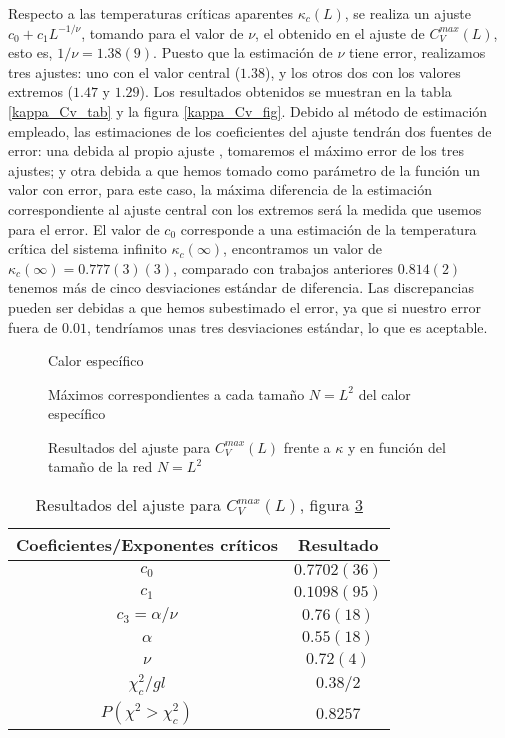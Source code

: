 Respecto a las temperaturas críticas aparentes $\kappa_c(L)$, se realiza un
ajuste $c_0+c_1L^{-1/\nu}$, tomando para el valor de $\nu$, el obtenido en el
ajuste de $C_V^{max}(L)$, esto es, $1/\nu=1.38(9)$. Puesto que la estimación de $\nu$ tiene error,
realizamos tres ajustes: uno con el valor central ($1.38$), y los otros dos con los
valores extremos ($1.47$ y $1.29$). Los resultados obtenidos se muestran en la
tabla \ref{kappa_Cv_tab} y la figura \ref{kappa_Cv_fig}. Debido al método
de estimación empleado, las estimaciones de los coeficientes del ajuste
tendrán dos fuentes de error: una debida al propio ajuste 
, tomaremos el máximo error de los tres ajustes; y otra debida a que hemos
tomado como parámetro de la función un valor con error, para este caso, la
máxima diferencia de la estimación correspondiente al ajuste central con los
extremos será la medida que usemos para el error. El valor
de $c_0$ corresponde a una estimación de la temperatura crítica del sistema
infinito $\kappa_c(\infty)$, encontramos un valor de
$\kappa_c(\infty)=0.777(3)(3)$, comparado con trabajos anteriores $0.814(2)$
\cite{Wheater_Critical_exponents} tenemos más de cinco desviaciones estándar
de diferencia. Las discrepancias pueden ser debidas a que hemos subestimado el
error, ya que si nuestro error fuera de $0.01$, tendríamos unas 
tres desviaciones estándar, lo que es aceptable.

\begin{figure}[h]
  \centering
  
  \caption{Calor específico}\label{Cv_fig}
\end{figure}

\begin{figure}[h]
  \centering
  
  \caption{Máximos correspondientes a cada tamaño $N=L^2$ del calor específico}\label{max_Cv_fig}
\end{figure}
\clearpage
\begin{figure}[h]
  \centering
  
  \caption{Resultados del ajuste para $C_V^{max}(L)$ frente a $\kappa$ y en
    función del tamaño de la red $N=L^2$}\label{max_Cv_L_fig}
\end{figure}

\begin{table}[h]
\centering
\begin{tabular}{|c|c|}\hline
 Coeficientes/Exponentes críticos & Resultado \\\hline
 $c_0$         & $0.7702(36) $ \\ \hline
 $c_1$         & $0.1098(95)$ \\ \hline
 $c_3=\alpha/\nu$  & $0.76(18)$  \\ \hline
$\alpha$      & $0.55(18)$ \\ \hline
$\nu $        & $0.72(4)$ \\ \hline
$\chi_c^2/gl$ &  $0.38/2$   \\ \hline
 $P(\chi^2>\chi_c^2)$&  $0.8257$\\ \hline
\end{tabular}
\caption{Resultados del ajuste para $C_V^{max}(L)$, figura \ref{max_Cv_L_fig}}\label{max_Cv_L_tab}
\end{table}

